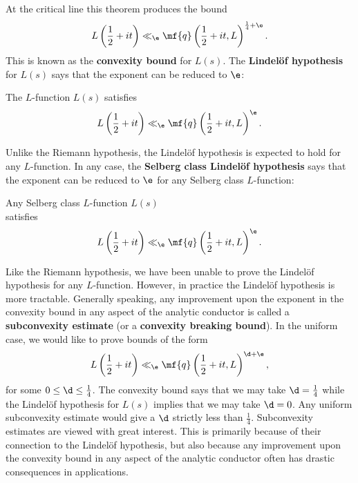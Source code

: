 \documentclass[12pt]{article}
\begin{document}
      At the critical line this theorem produces the bound
      \[
        L\left(\frac{1}{2}+it\right) \ll_{\e} \mf{q}\left(\frac{1}{2}+it,L\right)^{\frac{1}{4}+\e}.
      \]
      This is known as the \textbf{convexity bound} for \(L(s)\). The \textbf{Lindel\"of hypothesis} for \(L(s)\) says that the exponent can be reduced to \(\e\):

      \begin{conjecture*}
        The \(L\)-function \(L(s)\) satisfies
        \[
          L\left(\frac{1}{2}+it\right) \ll_{\e} \mf{q}\left(\frac{1}{2}+it,L\right)^{\e}.
        \]
      \end{conjecture*}

      Unlike the Riemann hypothesis, the Lindel\"of hypothesis is expected to hold for any \(L\)-function. In any case, the \textbf{Selberg class Lindel\"of hypothesis} says that the exponent can be reduced to \(\e\) for any Selberg class \(L\)-function:

      \begin{conjecture*}
        Any Selberg class \(L\)-function \(L(s)\) \\ satisfies
        \[
          L\left(\frac{1}{2}+it\right) \ll_{\e} \mf{q}\left(\frac{1}{2}+it,L\right)^{\e}.
        \]
      \end{conjecture*}

      Like the Riemann hypothesis, we have been unable to prove the Lindel\"of hypothesis for any \(L\)-function. However, in practice the Lindel\"of hypothesis is more tractable. Generally speaking, any improvement upon the exponent in the convexity bound in any aspect of the analytic conductor is called a \textbf{subconvexity estimate} (or a \textbf{convexity breaking bound}). In the uniform case, we would like to prove bounds of the form
      \[
        L\left(\frac{1}{2}+it\right) \ll_{\e} \mf{q}\left(\frac{1}{2}+it,L\right)^{\d+\e},
      \]
      for some \(0 \le \d \le \frac{1}{4}\). The convexity bound says that we may take \(\d = \frac{1}{4}\) while the Lindel\"of hypothesis for \(L(s)\) implies that we may take \(\d = 0\). Any uniform subconvexity estimate would give a \(\d\) strictly less than \(\frac{1}{4}\). Subconvexity estimates are viewed with great interest. This is primarily because of their connection to the Lindel\"of hypothesis, but also because any improvement upon the convexity bound in any aspect of the analytic conductor often has drastic consequences in applications.
\end{document}
